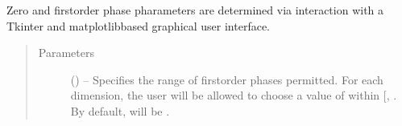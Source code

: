 \documentclass[letterpaper,10pt,english]{sphinxmanual}
\begin{document}
\begin{fulllineitems}
\begin{fulllineitems}
\sphinxAtStartPar
Zero\sphinxhyphen{} and first\sphinxhyphen{}order phase pharameters are determined via
interaction with a Tkinter\sphinxhyphen{} and matplotlib\sphinxhyphen{}based graphical user
interface.
\begin{quote}\begin{description}
\item[{Parameters}] \leavevmode
\sphinxAtStartPar
{} (\sphinxstyleliteralemphasis{\sphinxupquote{, }}) – Specifies the range of first\sphinxhyphen{}order phases permitted. For each
dimension, the user will be allowed to choose a value of 
within {[}, \sphinxtitleref{max\_p1}{]}. By default,  will be
.

\end{description}\end{quote}

\end{fulllineitems}



\end{fulllineitems}
\end{document}

